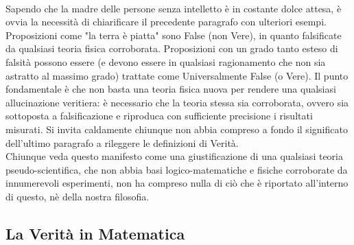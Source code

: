 \documentclass[]{scrbook}
\begin{document}
	\\
	Sapendo che la madre delle persone senza intelletto è in costante dolce attesa, è ovvia la necessità di chiarificare il precedente paragrafo con ulteriori esempi. Proposizioni come "la terra è piatta" sono False (non Vere), in quanto falsificate da qualsiasi teoria fisica corroborata. Proposizioni con un grado tanto esteso di falsità possono essere (e devono essere in qualsiasi ragionamento che non sia astratto al massimo grado) trattate come Universalmente False (o Vere).
	Il punto fondamentale è che non basta una teoria fisica nuova per rendere una qualsiasi allucinazione veritiera: è necessario che la teoria stessa sia corroborata, ovvero sia sottoposta a falsificazione e riproduca con sufficiente precisione i risultati misurati. Si invita caldamente chiunque non abbia compreso a fondo il significato dell'ultimo paragrafo a rileggere le definizioni di Verità.\\
	Chiunque veda questo manifesto come una giustificazione di una qualsiasi teoria pseudo-scientifica, che non abbia basi logico-matematiche e fisiche corroborate da innumerevoli esperimenti, non ha compreso nulla di ciò che è riportato all'interno di questo, nè della nostra filosofia.
	\subsection{La Verità in Matematica}
	
\end{document}
